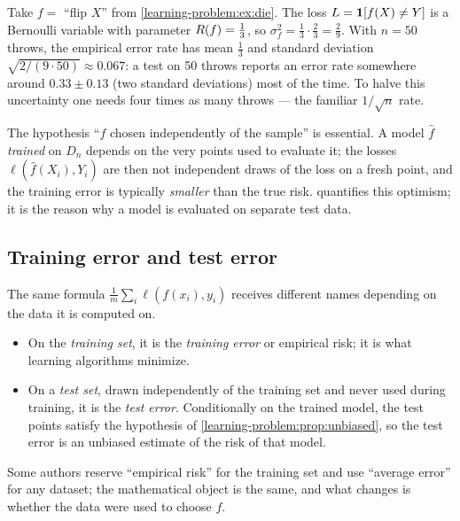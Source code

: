 \begin{notechapter}
\begin{example}
Take $f = $ ``flip $X$'' from \cref{learning-problem:ex:die}. The loss
$L = \mathbf{1}[f(X)\neq Y]$ is a Bernoulli variable with parameter
$R(f) = \frac13$, so $\sigma_f^2 = \frac13 \cdot \frac23 = \frac29$. With
$n = 50$ throws, the empirical error rate has mean $\frac13$ and standard
deviation $\sqrt{2/(9 \cdot 50)} \approx 0.067$: a test on 50 throws reports
an error rate somewhere around $0.33 \pm 0.13$ (two standard deviations) most
of the time. To halve this uncertainty one needs four times as many throws ---
the familiar $1/\sqrt n$ rate.
\end{example}

\begin{pitfall}
The hypothesis ``$f$ chosen independently of the sample'' is essential. A model
$\hat f$ \emph{trained} on $D_n$ depends on the very points used to evaluate
it; the losses $\ell(\hat f(X_i), Y_i)$ are then not independent draws of the
loss on a fresh point, and the training error is typically \emph{smaller} than
the true risk.  quantifies this optimism; it is the reason why a
model is evaluated on separate test data.
\end{pitfall}

\subsection{Training error and test error}

The same formula $\frac1m\sum_i \ell(f(x_i), y_i)$ receives different names
depending on the data it is computed on.
\begin{itemize}
  \item On the \emph{training set}, it is the \emph{training error} or
        empirical risk; it is what learning algorithms minimize.
  \item On a \emph{test set}, drawn independently of the training set and
        never used during training, it is the \emph{test error}. Conditionally
        on the trained model, the test points satisfy the hypothesis of
        \cref{learning-problem:prop:unbiased}, so the test error is an
        unbiased estimate of the risk of that model.
\end{itemize}
Some authors reserve ``empirical risk'' for the training set and use
``average error'' for any dataset; the mathematical object is the same, and
what changes is whether the data were used to choose $f$.


\end{notechapter}
